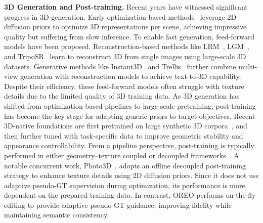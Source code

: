 \documentclass[runningheads]{llncs}
\begin{document}
\noindent\textbf{3D Generation and Post-training.}
Recent years have witnessed significant progress in 3D generation.
Early optimization-based methods~\cite{poole2022dreamfusion,lin2023magic3d,wang2024prolificdreamer} leverage 2D diffusion priors to optimize 3D representations per scene, achieving impressive quality but suffering from slow inference.
To enable fast generation, feed-forward models have been proposed.
Reconstruction-based methods like LRM~\cite{hong2023lrm}, LGM~\cite{tang2024lgm}, and TripoSR~\cite{tochilkin2024triposr} learn to reconstruct 3D from single images using large-scale 3D datasets.
Generative methods like Instant3D~\cite{li2024instant3d} and Trellis~\cite{xiang2025structured} further combine multi-view generation with reconstruction models to achieve text-to-3D capability.
Despite their efficiency, these feed-forward models often struggle with texture details due to the limited quality of 3D training data.
As 3D generation has shifted from optimization-based pipelines to large-scale pretraining, post-training has become the key stage for adapting generic priors to target objectives. Recent 3D-native foundations are first pretrained on large synthetic 3D corpora~\cite{xiang2025structured,zhao2025hunyuan3d,ye2025hi3dgen,li2025triposg,guo2025hyper3d,yushi2025gaussiananything}, and then further tuned with task-specific data to improve geometric stability and appearance controllability. From a pipeline perspective, post-training is typically performed in either geometry--texture coupled or decoupled frameworks~\cite{chen20253dtopia,xiang2025structured,yushi2025gaussiananything,lin2025diffsplat,zhao2025hunyuan3d,ye2025hi3dgen,li2025triposg,li2025step1x,guo2025hyper3d,zhang2025bang}. A notable concurrent work, Photo3D~\cite{photo3d}, adopts an offline decoupled post-training strategy to enhance texture details using 2D diffusion priors. Since it does not use adaptive pseudo-GT supervision during optimization, its performance is more dependent on the prepared training data. In contrast, OREO performs on-the-fly editing to provide adaptive pseudo-GT guidance, improving fidelity while maintaining semantic consistency.
\end{document}
